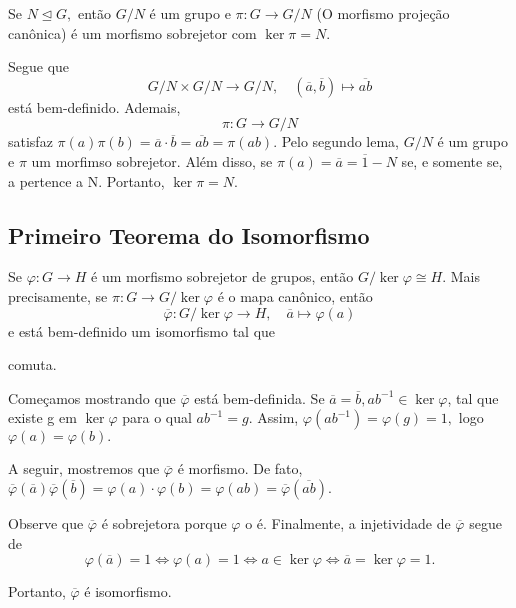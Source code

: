 \documentclass[Algebra/algebra_notes.tex]{subfiles}
\begin{document}
\begin{theorem*}
	Se $N\trianglelefteq{G},$ então $G/N$ é um grupo e $\pi:G\rightarrow G/N$ (O morfismo projeção can\^onica) é um morfismo
	sobrejetor com $\ker{\pi}=N.$
\end{theorem*}
\begin{proof*}
	Segue que
	$$
		G/N\times G/N\rightarrow G/N,\quad (\overline{a}, \overline{b})\mapsto \overline{ab}
	$$
	está bem-definido. Ademais,
	$$
		\pi:G\rightarrow G/N
	$$
	satisfaz $\pi(a)\pi(b) = \overline{a}\cdot \overline{b}=\overline{ab}=\pi(ab).$ Pelo segundo lema, $G/N$ é um grupo
	e $\pi$ um morfimso sobrejetor. Além disso, se $\pi(a) = \overline{a} = \overline{1} - N$ se, e somente se, a pertence a N.
	Portanto, $\ker{\pi} = N.$ \qedsymbol
\end{proof*}
\subsection{Primeiro Teorema do Isomorfismo}
\begin{theorem*}
	Se $\varphi:G\rightarrow H$ é um morfismo sobrejetor de grupos, então $G/\ker{\varphi}\cong H.$ Mais precisamente, se
	$\pi:G\rightarrow G/\ker{\varphi}$ é o mapa can\^onico, então
	$$
		\overline{\varphi}:G/\ker{\varphi}\rightarrow H,\quad \overline{a}\mapsto \varphi(a)
	$$
	e está bem-definido um isomorfismo tal que

	\begin{center}
	\end{center}
	comuta.
\end{theorem*}
\begin{proof*}
	Começamos mostrando que $\overline{\varphi}$ está bem-definida. Se $\overline{a}=\overline{b}, ab^{-1}\in\ker{\varphi}$, tal que
	existe g em $\ker{\varphi}$ para o qual $ab^{-1}=g.$ Assim, $\varphi(ab^{-1})=\varphi(g)=1,$ logo $\varphi(a)=\varphi(b).$

	A seguir, mostremos que $\overline{\varphi}$ é morfismo. De fato, $\overline{\varphi}(\overline{a})\overline{\varphi}(\overline{b})
		= \varphi(a)\cdot \varphi(b) = \varphi(ab)=\overline{\varphi}(\overline{ab}).$

	Observe que $\overline{\varphi}$ é sobrejetora porque $\varphi$ o é. Finalmente, a injetividade de $\overline{\varphi}$ segue de
	$$
		\varphi(\overline{a})=1 \Longleftrightarrow \varphi(a)=1 \Longleftrightarrow a\in\ker{\varphi} \Longleftrightarrow \overline{a}=\ker{\varphi} = 1.
	$$

	Portanto, $\overline{\varphi}$ é isomorfismo. \qedsymbol
\end{proof*}
\end{document}
